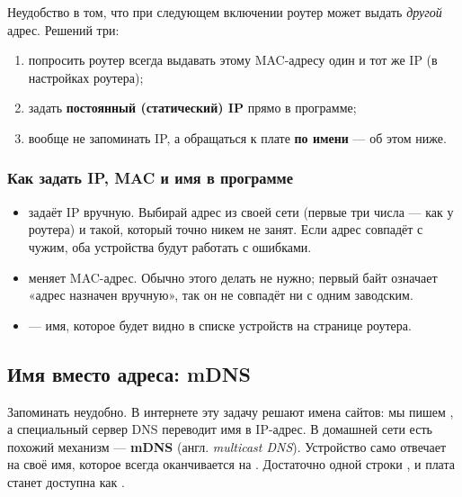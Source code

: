Неудобство в том, что при следующем включении роутер может выдать \emph{другой} адрес. Решений три:
\begin{enumerate}
  \item попросить роутер всегда выдавать этому MAC-адресу один и тот же IP (в настройках роутера);
  \item задать \textbf{постоянный (статический) IP} прямо в программе;
  \item вообще не запоминать IP, а обращаться к плате \textbf{по имени} --- об этом ниже.
\end{enumerate}

\subsubsection{Как задать IP, MAC и имя в программе}


\begin{itemize}
  \item {} задаёт IP вручную. Выбирай адрес из своей сети
        (первые три числа --- как у роутера) и такой, который точно никем не занят. Если адрес совпадёт
        с чужим, оба устройства будут работать с ошибками.
  \item {} меняет MAC-адрес. Обычно этого делать не нужно; первый байт
         означает «адрес назначен вручную», так он не совпадёт ни с одним заводским.
  \item {} --- имя, которое будет видно в списке устройств на странице роутера.
\end{itemize}

\subsection{Имя вместо адреса: mDNS}

Запоминать  неудобно. В интернете эту задачу решают имена сайтов: мы пишем
, а специальный сервер DNS переводит имя в IP-адрес. В домашней сети есть похожий
механизм --- \textbf{mDNS} (англ. \emph{multicast DNS}). Устройство само отвечает на своё имя, которое
всегда оканчивается на . Достаточно одной строки , и
плата станет доступна как .


